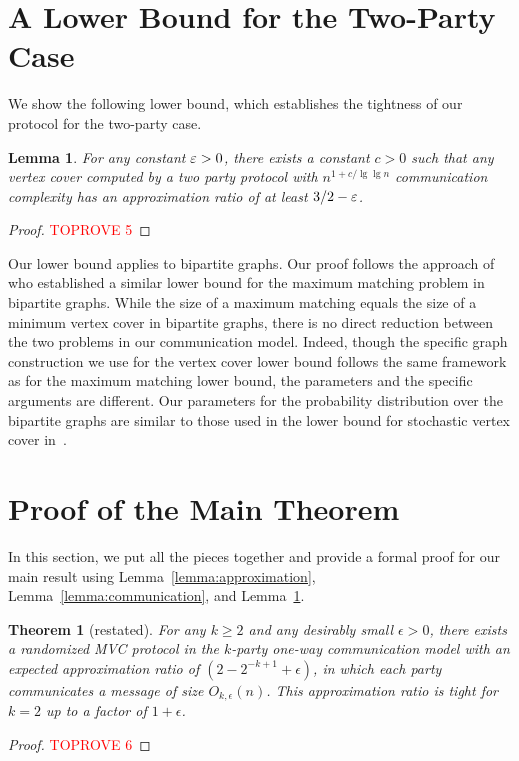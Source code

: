 \documentclass[11pt]{article}
\newtheorem*{theorem*}{Theorem}
\newtheorem{lemma}[theorem]{Lemma}
\begin{document}
\section{A Lower Bound for the Two-Party Case}
\label{sec:lower bound}
We show the following lower bound, which establishes the tightness of our protocol for the two-party case.  
\begin{lemma}
\label{lemma:lower-bound}
For any constant
$\varepsilon > 0$, there exists a constant $c > 0$ such that any vertex cover
computed by a two party protocol with $n^{1 + c/\lg\lg n}$ communication complexity
has an approximation ratio of at least $3/2 - \varepsilon$.
\end{lemma}
\begin{proof}\textcolor{red}{TOPROVE 5}\end{proof}
Our lower bound
applies to bipartite graphs. Our proof follows the approach
of~\cite{DBLP:conf/soda/GoelKK12} who established a similar lower
bound for the maximum matching problem in bipartite graphs.  While the
size of a maximum matching equals the size of a minimum vertex cover
in bipartite graphs, there is no direct reduction between the two
problems in our communication model.  Indeed, though the specific
graph construction we use for the vertex cover lower bound follows the
same framework as for the maximum matching lower bound, the parameters
and the specific arguments are different.  Our parameters for the
probability distribution over the bipartite graphs are similar to
those used in the lower bound for stochastic vertex cover
in~\cite{DBLP:conf/stoc/DerakhshanDH23}. \section{Proof of the Main Theorem}
\label{sec:main}
In this section, we  put all the pieces together and provide a formal proof for our main result using Lemma~\ref{lemma:approximation}, Lemma~\ref{lemma:communication}, and Lemma~\ref{lemma:lower-bound}.
\begin{theorem*}[restated]
For any $k \geq 2$ and any desirably small $\epsilon > 0$, there exists a randomized MVC protocol in the $k$-party one-way communication model with an expected approximation ratio of $(2 - 2^{-k+1} + \epsilon)$, in which each party communicates a message of size \(O_{k, \epsilon}(n)\). This approximation ratio is tight for $k=2$ up to a factor of $1+\epsilon$.
\end{theorem*}
\begin{proof}\textcolor{red}{TOPROVE 6}\end{proof}
 



\end{document}
